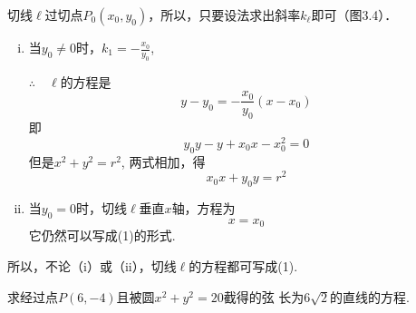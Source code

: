 \begin{analyze}
     切线$\ell$过切点$P_0(x_0,y_0)$，所以，只要设法求出斜率$k_{\ell}$即可（图3.4）．
\end{analyze}

\begin{solution}
\begin{enumerate}[(i)]
    \item 当$y_0\ne 0$时，$k_1=-\frac{x_0}{y_0}$,
    
\noindent
\begin{minipage}{.56\textwidth}
$\therefore\quad \ell$的方程是
   \[ y-y_0=-\frac{x_0}{y_0}(x-x_0)\]
    即
\[    y_0y-y+x_0x-x^2_0=0\]
    但是$x^2+y^2=r^2$,  两式相加，得
\begin{equation}
     x_0x+y_0y=r^2 \tag{1}
\end{equation}
    
\end{minipage}
\hfill
\begin{minipage}{.4\textwidth}
\centering
{}
\end{minipage}
\item 当$y_0=0$时，切线$\ell$垂直$x$轴，方程为
 \[   x=x_0\]
    它仍然可以写成(1)的形式.
\end{enumerate}
    所以，不论（i）或（ii），切线$\ell$的方程都可写成(1).
\end{solution}



\begin{example}
    求经过点$P(6,-4)$且被圆$x^2+y^2=20$截得的弦
长为$6\sqrt{2}$的直线的方程.
\end{example}

